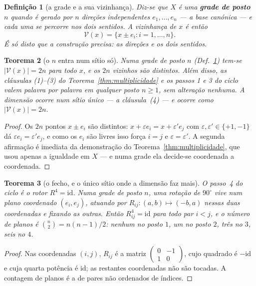 \documentclass[11pt,a4paper]{article}
\newtheorem{teorema}{Teorema}
\newtheorem{definicao}[teorema]{Definição}
\begin{document}
\begin{definicao}[a grade e a sua vizinhança]\label{def:grade}
Diz-se que $X$ é uma \textbf{grade de posto $n$} quando é gerado por $n$
direções independentes $e_1,\dots,e_n$ --- a base canónica --- e cada uma se
percorre nos dois sentidos. A vizinhança de $x$ é então
\[
\mathcal{V}(x)=\{x\pm e_i : i=1,\dots,n\}.
\]
É só disto que a construção precisa: as direções e os dois sentidos.
\end{definicao}

\begin{teorema}[o $n$ entra num sítio só]\label{thm:dimensao}
Numa grade de posto $n$ (Def.~\ref{def:grade}) tem-se
$\lvert \mathcal{V}(x)\rvert=2n$ para todo $x$, e os $2n$ vizinhos são distintos. Além
disso, as cláusulas (1)--(3) do Teorema~\ref{thm:multiplicidade} e os passos 1 e
3 do ciclo valem palavra por palavra em qualquer posto $n\ge1$, sem alteração
nenhuma. A dimensão ocorre num sítio único --- a cláusula~(4) --- e ocorre como
$\lvert \mathcal{V}(x)\rvert=2n$.
\end{teorema}

\begin{proof}
Os $2n$ pontos $x\pm e_i$ são distintos: $x+\varepsilon e_i=x+\varepsilon'e_j$
com $\varepsilon,\varepsilon'\in\{+1,-1\}$ dá $\varepsilon e_i=\varepsilon'e_j$,
e como os $e_i$ são livres isso força $i=j$ e $\varepsilon=\varepsilon'$. A
segunda afirmação é imediata da demonstração do
Teorema~\ref{thm:multiplicidade}, que usou apenas a igualdade em $X$ --- e numa
grade ela decide-se coordenada a coordenada.
\end{proof}

\begin{teorema}[o fecho, e o único sítio onde a dimensão faz mais]\label{thm:fecho}
O passo~4 do ciclo é o rotor $R^{4}=\mathrm{id}$. Numa grade de posto $n$, uma
rotação de $90^{\circ}$ vive num \emph{plano} coordenado $(e_i,e_j)$, atuando
por
$R_{ij}\colon(a,b)\mapsto(-b,a)$ nessas duas coordenadas e fixando as outras.
Então $R_{ij}^{4}=\mathrm{id}$ para todo par $i<j$, e o número de planos é
$\binom{n}{2}=n(n-1)/2$: nenhum no posto $1$, um no posto $2$, três no $3$,
seis no $4$.
\end{teorema}

\begin{proof}
Nas coordenadas $(i,j)$, $R_{ij}$ é a matriz $\left(\begin{smallmatrix}0&-1\\
1&0\end{smallmatrix}\right)$, cujo quadrado é $-\mathrm{id}$ e cuja quarta
potência é $\mathrm{id}$; as restantes coordenadas não são tocadas. A contagem
de planos é a de pares não ordenados de índices.
\end{proof}
\end{document}
